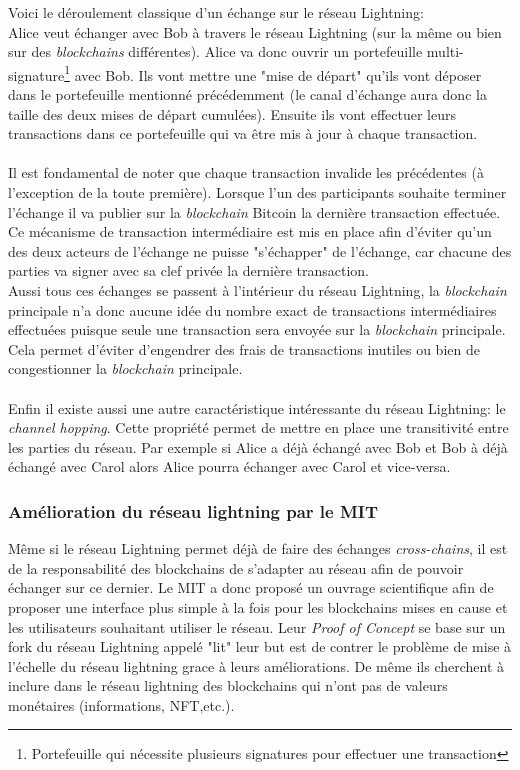 Voici le déroulement classique d'un échange sur le réseau Lightning:\\ Alice veut échanger avec Bob à travers le réseau Lightning (sur la même ou bien sur des \textit{\gls{blockchain}s} différentes). 
Alice va donc ouvrir un portefeuille multi-signature\footnote{Portefeuille qui nécessite plusieurs signatures pour effectuer une transaction} avec Bob. Ils vont mettre une "mise de départ" qu'ils vont déposer dans le portefeuille mentionné précédemment (le canal d'échange aura donc la taille des deux mises de départ cumulées).
Ensuite ils vont effectuer leurs transactions dans ce portefeuille qui va être mis à jour à chaque transaction.\\ \\ 
Il est fondamental de noter que chaque transaction invalide les précédentes (à l'exception de la toute première). Lorsque l'un des participants souhaite terminer l'échange il va publier sur la \textit{\gls{blockchain}} Bitcoin la dernière transaction effectuée.
Ce mécanisme de transaction intermédiaire est mis en place afin d'éviter qu'un des deux acteurs de l'échange ne puisse "s'échapper" de l'échange, car chacune des parties va signer avec sa clef privée la dernière transaction. \\
Aussi tous ces échanges se passent à l'intérieur du réseau Lightning, la \textit{\gls{blockchain}} principale n'a donc aucune idée du nombre exact de transactions intermédiaires effectuées puisque seule une transaction sera envoyée sur la \textit{\gls{blockchain}} principale. 
Cela permet d'éviter d'engendrer des frais de transactions inutiles ou bien de congestionner la \textit{\gls{blockchain}} principale.\\ \\
 Enfin il existe aussi une autre caractéristique intéressante du réseau Lightning: le \textit{channel hopping}. 
Cette propriété permet de mettre en place une transitivité entre les parties du réseau. Par exemple si Alice a déjà échangé avec Bob et Bob à déjà échangé avec Carol alors Alice pourra échanger avec Carol et vice-versa. 


\subsubsection{Amélioration du réseau lightning par le MIT}

Même si le réseau Lightning permet déjà de faire des échanges \textit{\gls{cross-chain}s}\cite{lightningCrossChain}, il est de la responsabilité des \gls{blockchain}s de s'adapter au réseau afin de pouvoir échanger sur ce dernier.
Le MIT a donc proposé un ouvrage scientifique\cite{mathus2018lightning} afin de proposer une interface plus simple à la fois pour les \gls{blockchain}s mises en cause et les utilisateurs souhaitant utiliser le réseau.
Leur \textit{Proof of Concept}\cite{pocMIT} se base sur un fork du réseau Lightning appelé "lit" leur but est de contrer le problème de mise à l'échelle du réseau lightning grace à leurs améliorations.
De même ils cherchent à inclure dans le réseau lightning des \gls{blockchain}s qui n'ont pas de valeurs monétaires (informations, NFT,etc.).

